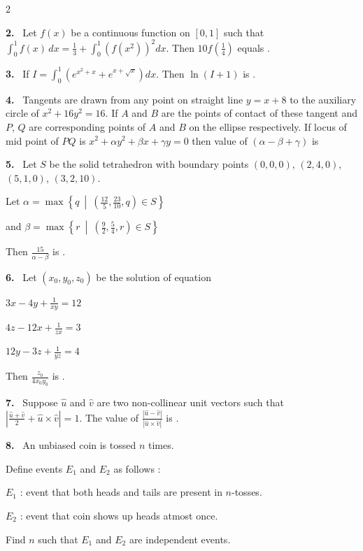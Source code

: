 \documentclass[10pt]{extarticle}
\newcommand{\qn}[1]{\par\smallskip\noindent\textbf{#1.}~}
\begin{document}
\begin{multicols}{2}
\qn{2} Let $f(x)$ be a continuous function on $[0,1]$ such that $\displaystyle\int_0^1f(x)\,dx=\frac13+\int_0^1\left(f(x^2)\right)^2dx$. Then $10f\left(\frac14\right)$ equals \underline{\hspace{1cm}}.
\qn{3} If $I=\displaystyle\int_0^1\left(e^{x^2+x}+e^{x+\sqrt x}\right)dx$. Then $\ln(I+1)$ is \underline{\hspace{1cm}}.
\qn{4} Tangents are drawn from any point on straight line $y=x+8$ to the auxiliary circle of $x^2+16y^2=16$. If $A$ and $B$ are the points of contact of these tangent and $P$, $Q$ are corresponding points of $A$ and $B$ on the ellipse respectively. If locus of mid point of $PQ$ is $x^2+\alpha y^2+\beta x+\gamma y=0$ then value of $(\alpha-\beta+\gamma)$ is
\qn{5} Let $S$ be the solid tetrahedron with boundary points $(0,0,0)$, $(2,4,0)$, $(5,1,0)$, $(3,2,10)$.\par
Let $\alpha=\max\left\{q\ \middle|\ \left(\frac{12}{5},\frac{23}{10},q\right)\in S\right\}$\par
and $\beta=\max\left\{r\ \middle|\ \left(\frac92,\frac54,r\right)\in S\right\}$\par
Then $\frac{15}{\alpha-\beta}$ is \underline{\hspace{1cm}}.
\qn{6} Let $(x_0,y_0,z_0)$ be the solution of equation\par
$3x-4y+\frac{1}{xy}=12$\par
$4z-12x+\frac{1}{zx}=3$\par
$12y-3z+\frac{1}{yz}=4$\par
Then $\frac{z_0}{4x_0y_0}$ is \underline{\hspace{1cm}}.
\qn{7} Suppose $\hat u$ and $\hat v$ are two non-collinear unit vectors such that $\left|\frac{\hat u+\hat v}{2}+\hat u\times\hat v\right|=1$. The value of $\frac{|\hat u-\hat v|}{|\hat u\times\hat v|}$ is \underline{\hspace{1cm}}.
\qn{8} An unbiased coin is tossed $n$ times.\par
Define events $E_1$ and $E_2$ as follows :\par
$E_1$ : event that both heads and tails are present in $n$-tosses.\par
$E_2$ : event that coin shows up heads atmost once.\par
Find $n$ such that $E_1$ and $E_2$ are independent events.
\end{multicols}
\end{document}
